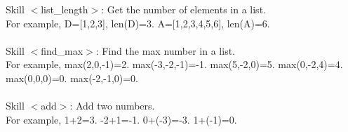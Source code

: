 \documentclass{article} %
\begin{document}
\newpage


\begin{tcolorbox}[title = {Skills for Dynamic Programming}, colback = Apricot!25!white, colframe = BrickRed!75!black] 
Skill $<$list\_length$>$: Get the number of elements in a list.  \\
For example, D=[1,2,3], len(D)=3. A=[1,2,3,4,5,6], len(A)=6. \\ \\

Skill $<$find\_max$>$: Find the max number in a list. \\
For example, max(2,0,-1)=2. max(-3,-2,-1)=-1. max(5,-2,0)=5. max(0,-2,4)=4.  max(0,0,0)=0. max(-2,-1,0)=0. \\ \\

Skill $<$add$>$: Add two numbers. \\
For example, 1+2=3. -2+1=-1. 0+(-3)=-3. 1+(-1)=0. \\
\end{tcolorbox}
\noindent\begin{minipage}{\textwidth}
 \label{Tab:dp_skill}
\end{minipage}

\newpage
\end{document}
